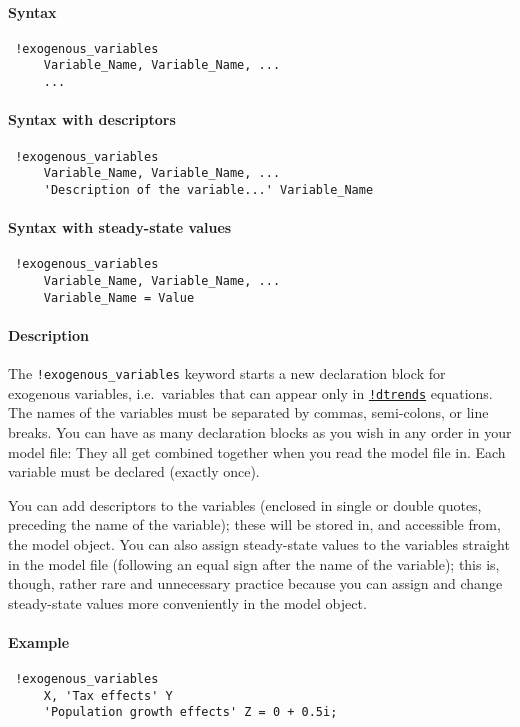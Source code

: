 


	\paragraph{Syntax}
 
 \begin{verbatim}
 !exogenous_variables
     Variable_Name, Variable_Name, ...
     ...
 \end{verbatim}
 
 \paragraph{Syntax with descriptors}
 
 \begin{verbatim}
 !exogenous_variables
     Variable_Name, Variable_Name, ...
     'Description of the variable...' Variable_Name
 \end{verbatim}
 
 \paragraph{Syntax with steady-state values}
 
 \begin{verbatim}
 !exogenous_variables
     Variable_Name, Variable_Name, ...
     Variable_Name = Value
 \end{verbatim}
 
 \paragraph{Description}
 
 The \texttt{!exogenous\_variables} keyword starts a new declaration
 block for exogenous variables, i.e.~variables that can appear only in
 \href{modellang/dtrends}{\texttt{!dtrends}} equations. The names of the
 variables must be separated by commas, semi-colons, or line breaks. You
 can have as many declaration blocks as you wish in any order in your
 model file: They all get combined together when you read the model file
 in. Each variable must be declared (exactly once).
 
 You can add descriptors to the variables (enclosed in single or double
 quotes, preceding the name of the variable); these will be stored in,
 and accessible from, the model object. You can also assign steady-state
 values to the variables straight in the model file (following an equal
 sign after the name of the variable); this is, though, rather rare and
 unnecessary practice because you can assign and change steady-state
 values more conveniently in the model object.
 
 \paragraph{Example}
 
 \begin{verbatim}
 !exogenous_variables
     X, 'Tax effects' Y
     'Population growth effects' Z = 0 + 0.5i;
 \end{verbatim}


